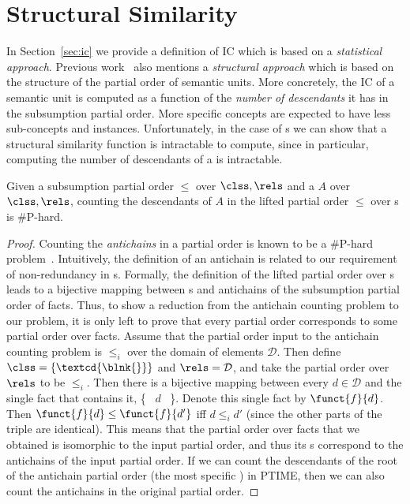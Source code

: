 \appendix
\label{Sec:Appendix}

\section{Structural Similarity}
\label{sec:structure}
In Section~\ref{sec:ic} we provide a definition of IC which is based on a \emph{statistical approach}. Previous work~\cite{mobasher2003semantically} also mentions a \emph{structural approach} which is based on the structure of the partial order of semantic units. More concretely, the IC of a semantic unit is computed as a function of the \emph{number of descendants} it has in the subsumption partial order. More specific concepts are expected to have less sub-concepts and instances.
Unfortunately, in the case of \fset{}s we can show that a structural similarity function is intractable to compute, since in particular, computing the number of descendants of a \fset{} is intractable.
\begin{proposition}
	Given a subsumption partial order $\leq$ over $\clss,\rels$ and a \fset{} $A$ over $\clss,\rels$, counting the descendants of $A$ in the lifted partial order $\leq$ over \fset{}s is \#P-hard.
\end{proposition}
\begin{proof}
	Counting the \emph{antichains} in a partial order is known to be a \#P-hard problem~\cite{provan1983complexity}. Intuitively, the definition of an antichain is related to our requirement of non-redundancy in \fset{}s. Formally, the definition of the lifted partial order over \fset{}s leads to a bijective mapping between \fset{}s and antichains of the subsumption partial order of facts. Thus, to show a reduction from the antichain counting problem to our problem, it is only left to prove that every partial order corresponds to some partial order over facts. Assume that the partial order input to the antichain counting problem is $\leq_i$ over the domain of elements $\mathcal{D}$. Then define $\clss=\{\textcd{\blnk{}}\}$ and $\rels=\mathcal{D}$, and take the partial order over $\rels$ to be $\leq_i$. Then there is a bijective mapping between every $d\in\mathcal{D}$ and the single fact that contains it, \{\textcd{\blnk{}}~ $d$~ \textcd{\blnk{}}\}. Denote this single fact by $\funct{f}{d}$. Then $\funct{f}{d}\leq \funct{f}{d'}$ iff $d\leq_i d'$ (since the other parts of the triple are identical). This means that the partial order over facts that we obtained is isomorphic to the input partial order, and thus its \fset{}s correspond to the antichains of the input partial order. If we can count the descendants of the root of the antichain partial order (the most specific \fset{}) in PTIME, then we can also count the antichains in the original partial order.
\end{proof}

